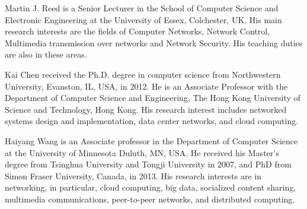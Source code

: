 \documentclass[10pt,journal,compsoc]{IEEEtran}
\begin{document}
\begin{IEEEbiography}
{Martin J. Reed} is a Senior Lecturer in the School of Computer Science and Electronic Engineering at the University of Essex, Colchester, UK. His main research interests are the fields of Computer Networks, Network Control, Multimedia transmission over networks and Network Security. His teaching duties are also in these areas.
\end{IEEEbiography}

\begin{IEEEbiography}
{Kai Chen} received the Ph.D. degree in computer science from Northwestern University, Evanston, IL, USA, in 2012. He is an Associate Professor with the Department of Computer Science and Engineering, The Hong Kong University of Science and Technology, Hong Kong. His research interest includes networked systems design and implementation, data center networks, and cloud computing.
\end{IEEEbiography}

\begin{IEEEbiography}
{Haiyang Wang} is an Associate professor in the Department of Computer Science at the University of Minnesota Duluth, MN, USA. He received his Master's degree from Tsinghua University and Tongji University in 2007, and PhD from Simon Fraser University, Canada, in 2013. His research interests are in networking, in particular, cloud computing, big data, socialized content sharing, multimedia communications, peer-to-peer networks, and distributed computing.
\end{IEEEbiography}
\end{document}
